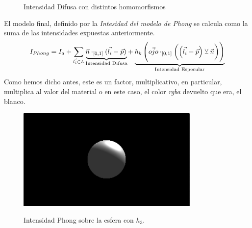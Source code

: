 \begin{figure}[H]
  \centering
  \captionsetup{justification=centering}%
  \caption{Intensidad Difusa con distintos homomorfismos}
\end{figure}
El modelo final, definido por la \textit{Intesidad del modelo de Phong} se calcula como la suma de las intensidades expuestas anteriormente.
\[I_{Phong}=I_a+\sum_{\Vec{l_i}\in L} \mathrlap{\underbrace{\phantom{\Vec{n}\cdot_{[0, 1]}(\Vec{l_i}-\Vec{p})}}_{\text{Intensidad Difusa}}}\Vec{n}\cdot_{[0, 1]}(\Vec{l_i}-\Vec{p}) + \mathrlap{\underbrace{\phantom{h_k\left(\Vec{ojo}\cdot_{[0, 1]}\left(\left(\Vec{l_i}-\Vec{p}\right) \veebar \Vec{n}\right)\right)}}_{\text{Intensidad Especular}}}h_k\left(\Vec{ojo}\cdot_{[0, 1]}\left(\left(\Vec{l_i}-\Vec{p}\right) \veebar \Vec{n}\right)\right)\]
Como hemos dicho antes, este es un factor, multiplicativo, en particular, multiplica al valor del material o en este caso, el color \textit{rgba} devuelto que era, el blanco.
\begin{figure}[H]
  \centering
  \captionsetup{justification=centering}%
  \includegraphics[width=0.8\textwidth]{secciones/imagenes/phong.jpeg}\label{fig:phong}
  \caption{Intensidad Phong sobre la esfera con \(h_3\).}
\end{figure}

